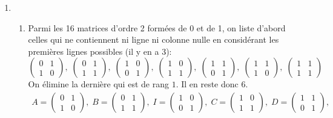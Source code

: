 \begin{enumerate}
\item
\begin{enumerate}
  \item Parmi les 16 matrices d'ordre 2 formées de 0 et de 1, on liste d'abord celles qui ne contiennent ni ligne ni colonne nulle en considérant les premières lignes possibles (il y en a 3):
\begin{displaymath}
\begin{pmatrix}
0 & 1 \\ 1 & 0  
\end{pmatrix},\;
\begin{pmatrix}
0 & 1 \\ 1 & 1  
\end{pmatrix},\;
\begin{pmatrix}
1 & 0 \\ 0 & 1  
\end{pmatrix},\;
\begin{pmatrix}
1 & 0 \\ 1 & 1  
\end{pmatrix},\;
\begin{pmatrix}
1 & 1 \\ 0 & 1  
\end{pmatrix},\;
\begin{pmatrix}
1 & 1 \\ 1 & 0  
\end{pmatrix},\;
\begin{pmatrix}
1 & 1 \\ 1 & 1  
\end{pmatrix}
\end{displaymath}
On élimine la dernière qui est de rang $1$. Il en reste donc $6$. 
\begin{multline*}
A=
\begin{pmatrix}
0 & 1 \\ 1 & 0  
\end{pmatrix},\;
B=
\begin{pmatrix}
0 & 1 \\ 1 & 1  
\end{pmatrix},\;
I=
\begin{pmatrix}
1 & 0 \\ 0 & 1  
\end{pmatrix},\;
C=
\begin{pmatrix}
1 & 0 \\ 1 & 1  
\end{pmatrix},\;
D=
\begin{pmatrix}
1 & 1 \\ 0 & 1  
\end{pmatrix},\\

\end{multline*}
\end{enumerate}
\end{enumerate}
